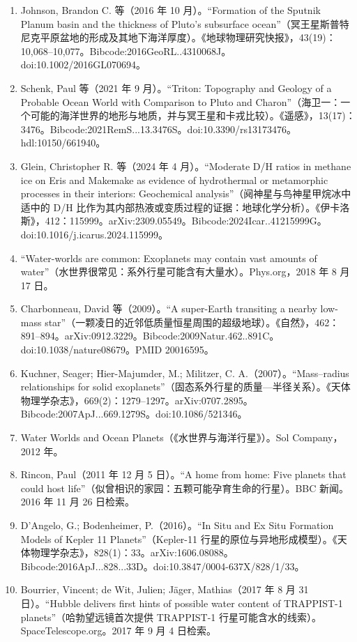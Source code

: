 \begin{enumerate}
\item Johnson, Brandon C. 等（2016 年 10 月）。“Formation of the Sputnik Planum basin and the thickness of Pluto’s subsurface ocean”（冥王星斯普特尼克平原盆地的形成及其地下海洋厚度）。《地球物理研究快报》，43(19)：10,068–10,077。Bibcode:2016GeoRL..4310068J。doi:10.1002/2016GL070694。
\item Schenk, Paul 等（2021 年 9 月）。“Triton: Topography and Geology of a Probable Ocean World with Comparison to Pluto and Charon”（海卫一：一个可能的海洋世界的地形与地质，并与冥王星和卡戎比较）。《遥感》，13(17)：3476。Bibcode:2021RemS...13.3476S。doi:10.3390/rs13173476。hdl:10150/661940。
\item Glein, Christopher R. 等（2024 年 4 月）。“Moderate D/H ratios in methane ice on Eris and Makemake as evidence of hydrothermal or metamorphic processes in their interiors: Geochemical analysis”（阋神星与鸟神星甲烷冰中适中的 D/H 比作为其内部热液或变质过程的证据：地球化学分析）。《伊卡洛斯》，412：115999。arXiv:2309.05549。Bibcode:2024Icar..41215999G。doi:10.1016/j.icarus.2024.115999。
\item “Water-worlds are common: Exoplanets may contain vast amounts of water”（水世界很常见：系外行星可能含有大量水）。Phys.org，2018 年 8 月 17 日。
\item Charbonneau, David 等（2009）。“A super-Earth transiting a nearby low-mass star”（一颗凌日的近邻低质量恒星周围的超级地球）。《自然》，462：891–894。arXiv:0912.3229。Bibcode:2009Natur.462..891C。doi:10.1038/nature08679。PMID 20016595。
\item Kuchner, Seager; Hier-Majumder, M.; Militzer, C. A.（2007）。“Mass–radius relationships for solid exoplanets”（固态系外行星的质量—半径关系）。《天体物理学杂志》，669(2)：1279–1297。arXiv:0707.2895。Bibcode:2007ApJ...669.1279S。doi:10.1086/521346。
\item Water Worlds and Ocean Planets（《水世界与海洋行星》）。Sol Company，2012 年。
\item Rincon, Paul（2011 年 12 月 5 日）。“A home from home: Five planets that could host life”（似曾相识的家园：五颗可能孕育生命的行星）。BBC 新闻。2016 年 11 月 26 日检索。
\item D’Angelo, G.; Bodenheimer, P.（2016）。“In Situ and Ex Situ Formation Models of Kepler 11 Planets”（Kepler-11 行星的原位与异地形成模型）。《天体物理学杂志》，828(1)：33。arXiv:1606.08088。Bibcode:2016ApJ...828...33D。doi:10.3847/0004-637X/828/1/33。
\item Bourrier, Vincent; de Wit, Julien; Jäger, Mathias（2017 年 8 月 31 日）。“Hubble delivers first hints of possible water content of TRAPPIST-1 planets”（哈勃望远镜首次提供 TRAPPIST-1 行星可能含水的线索）。SpaceTelescope.org。2017 年 9 月 4 日检索。

\end{enumerate}
